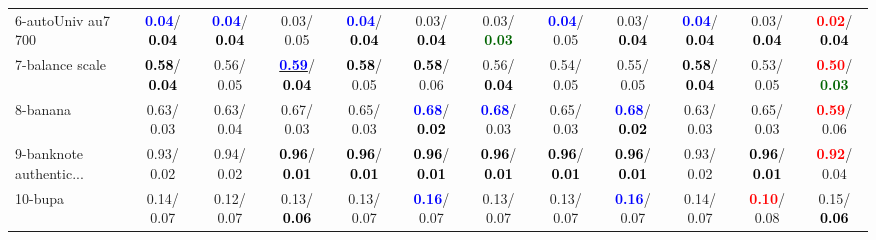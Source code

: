 \begin{table}[h]
\begin{center}
{\begin{tabular}{lc|c|c|c|c|c|c|c|c|c|c}
6-autoUniv au7 700 & \textcolor{blue}{\textbf{  0.04}}/\textcolor{black}{\textbf{  0.04}} & \textcolor{blue}{\textbf{  0.04}}/\textcolor{black}{\textbf{  0.04}} &   0.03/  0.05 & \textcolor{blue}{\textbf{  0.04}}/\textcolor{black}{\textbf{  0.04}} &   0.03/\textcolor{black}{\textbf{  0.04}} &   0.03/\textcolor{darkgreen}{\textbf{  0.03}} & \textcolor{blue}{\textbf{  0.04}}/  0.05 &   0.03/\textcolor{black}{\textbf{  0.04}} & \textcolor{blue}{\textbf{  0.04}}/\textcolor{black}{\textbf{  0.04}} &   0.03/\textcolor{black}{\textbf{  0.04}} & \textcolor{red}{\textbf{  0.02}}/\textcolor{black}{\textbf{  0.04}} \\
7-balance scale & \textcolor{black}{\textbf{  0.58}}/\textcolor{black}{\textbf{  0.04}} &   0.56/  0.05 & \underline{\textcolor{blue}{\textbf{  0.59}}}/\textcolor{black}{\textbf{  0.04}} & \textcolor{black}{\textbf{  0.58}}/  0.05 & \textcolor{black}{\textbf{  0.58}}/  0.06 &   0.56/\textcolor{black}{\textbf{  0.04}} &   0.54/  0.05 &   0.55/  0.05 & \textcolor{black}{\textbf{  0.58}}/\textcolor{black}{\textbf{  0.04}} &   0.53/  0.05 & \textcolor{red}{\textbf{  0.50}}/\textcolor{darkgreen}{\textbf{  0.03}} \\ \hline
8-banana &   0.63/  0.03 &   0.63/  0.04 &   0.67/  0.03 &   0.65/  0.03 & \textcolor{blue}{\textbf{  0.68}}/\textcolor{black}{\textbf{  0.02}} & \textcolor{blue}{\textbf{  0.68}}/  0.03 &   0.65/  0.03 & \textcolor{blue}{\textbf{  0.68}}/\textcolor{black}{\textbf{  0.02}} &   0.63/  0.03 &   0.65/  0.03 & \textcolor{red}{\textbf{  0.59}}/  0.06 \\
9-banknote authentic... &   0.93/  0.02 &   0.94/  0.02 & \textcolor{black}{\textbf{  0.96}}/\textcolor{black}{\textbf{  0.01}} & \textcolor{black}{\textbf{  0.96}}/\textcolor{black}{\textbf{  0.01}} & \textcolor{black}{\textbf{  0.96}}/\textcolor{black}{\textbf{  0.01}} & \textcolor{black}{\textbf{  0.96}}/\textcolor{black}{\textbf{  0.01}} & \textcolor{black}{\textbf{  0.96}}/\textcolor{black}{\textbf{  0.01}} & \textcolor{black}{\textbf{  0.96}}/\textcolor{black}{\textbf{  0.01}} &   0.93/  0.02 & \textcolor{black}{\textbf{  0.96}}/\textcolor{black}{\textbf{  0.01}} & \textcolor{red}{\textbf{  0.92}}/  0.04 \\
10-bupa &   0.14/  0.07 &   0.12/  0.07 &   0.13/\textcolor{black}{\textbf{  0.06}} &   0.13/  0.07 & \textcolor{blue}{\textbf{  0.16}}/  0.07 &   0.13/  0.07 &   0.13/  0.07 & \textcolor{blue}{\textbf{  0.16}}/  0.07 &   0.14/  0.07 & \textcolor{red}{\textbf{  0.10}}/  0.08 &   0.15/\textcolor{black}{\textbf{  0.06}} \\

\end{tabular}}
\end{center}
\end{table}
